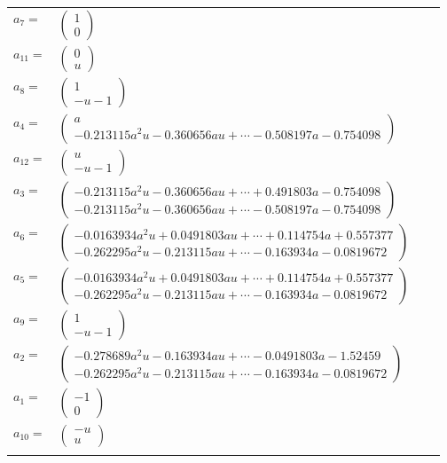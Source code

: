 \documentclass[1p]{elsarticle_modified}
\theoremstyle{definition}
\begin{document}
\begin{tabular}{m{7pt} m{180pt} m{7pt} m{180pt} }
\flushright $a_{7}=$&$\begin{pmatrix}1\\0\end{pmatrix}$ \\
\flushright $a_{11}=$&$\begin{pmatrix}0\\u\end{pmatrix}$ \\
\flushright $a_{8}=$&$\begin{pmatrix}1\\- u-1\end{pmatrix}$ \\
\flushright $a_{4}=$&$\begin{pmatrix}a\\-0.213115 a^{2} u-0.360656 a u+\cdots-0.508197 a-0.754098\end{pmatrix}$ \\
\flushright $a_{12}=$&$\begin{pmatrix}u\\- u-1\end{pmatrix}$ \\
\flushright $a_{3}=$&$\begin{pmatrix}-0.213115 a^{2} u-0.360656 a u+\cdots+0.491803 a-0.754098\\-0.213115 a^{2} u-0.360656 a u+\cdots-0.508197 a-0.754098\end{pmatrix}$ \\
\flushright $a_{6}=$&$\begin{pmatrix}-0.0163934 a^{2} u+0.0491803 a u+\cdots+0.114754 a+0.557377\\-0.262295 a^{2} u-0.213115 a u+\cdots-0.163934 a-0.0819672\end{pmatrix}$ \\
\flushright $a_{5}=$&$\begin{pmatrix}-0.0163934 a^{2} u+0.0491803 a u+\cdots+0.114754 a+0.557377\\-0.262295 a^{2} u-0.213115 a u+\cdots-0.163934 a-0.0819672\end{pmatrix}$ \\
\flushright $a_{9}=$&$\begin{pmatrix}1\\- u-1\end{pmatrix}$ \\
\flushright $a_{2}=$&$\begin{pmatrix}-0.278689 a^{2} u-0.163934 a u+\cdots-0.0491803 a-1.52459\\-0.262295 a^{2} u-0.213115 a u+\cdots-0.163934 a-0.0819672\end{pmatrix}$ \\
\flushright $a_{1}=$&$\begin{pmatrix}-1\\0\end{pmatrix}$ \\
\flushright $a_{10}=$&$\begin{pmatrix}- u\\u\end{pmatrix}$\\&\end{tabular}
\end{document}
